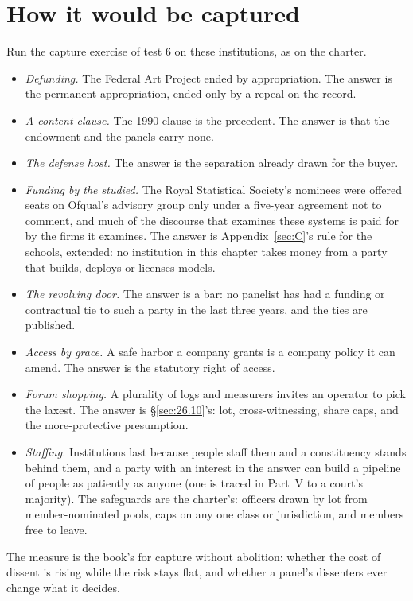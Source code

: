 \section{How it would be captured}
\label{sec:28.7}
Run the capture exercise of test 6 on these institutions, as on the charter.

\begin{itemize}
\item \emph{Defunding.} The Federal Art Project ended by appropriation. The answer is the permanent appropriation, ended only by a repeal on the record.
\item \emph{A content clause.} The 1990 clause is the precedent. The answer is that the endowment and the panels carry none.
\item \emph{The defense host.} The answer is the separation already drawn for the buyer.
\item \emph{Funding by the studied.} The Royal Statistical Society's nominees were offered seats on Ofqual's advisory group only under a five-year agreement not to comment, and much of the discourse that examines these systems is paid for by the firms it examines. The answer is Appendix~\ref{sec:C}'s rule for the schools, extended: no institution in this chapter takes money from a party that builds, deploys or licenses models.
\item \emph{The revolving door.} The answer is a bar: no panelist has had a funding or contractual tie to such a party in the last three years, and the ties are published.
\item \emph{Access by grace.} A safe harbor a company grants is a company policy it can amend. The answer is the statutory right of access.
\item \emph{Forum shopping.} A plurality of logs and measurers invites an operator to pick the laxest. The answer is \S\ref{sec:26.10}'s: lot, cross-witnessing, share caps, and the more-protective presumption.
\item \emph{Staffing.} Institutions last because people staff them and a constituency stands behind them, and a party with an interest in the answer can build a pipeline of people as patiently as anyone (one is traced in Part~V to a court's majority). The safeguards are the charter's: officers drawn by lot from member-nominated pools, caps on any one class or jurisdiction, and members free to leave.
\end{itemize}

The measure is the book's for capture without abolition: whether the cost of dissent is rising while the risk stays flat, and whether a panel's dissenters ever change what it decides.
